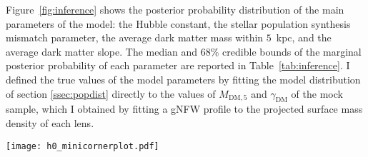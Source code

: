 \documentclass{aa}
\def\mfive{M_{\mathrm{DM},5}}
\def\gammadm{\gamma_{\mathrm{DM}}}
\def\asps{\alpha_{\mathrm{sps}}}
\def\Fref#1{Figure~\ref{#1}\xspace}
\def\Tref#1{Table~\ref{#1}\xspace}
\begin{document}
\Fref{fig:inference} shows the posterior probability distribution of the main parameters of the model: the Hubble constant, the stellar population synthesis mismatch parameter, the average dark matter mass within $5$~kpc, and the average dark matter slope.
The median and 68\% credible bounds of the marginal posterior probability of each parameter are reported in \Tref{tab:inference}.
I defined the true values of the model parameters by fitting the model distribution of section \ref{ssec:popdist} directly to the values of $\mfive$ and $\gammadm$ of the mock sample, which I obtained by fitting a gNFW profile to the projected surface mass density of each lens.
%
\begin{figure*}
\texttt{[image: h0\_minicornerplot.pdf]}
\caption{
Posterior probability distribution of the four key parameters of the model: the Hubble constant, the stellar population synthesis mismatch parameter, the average $\log{\mfive}$, and the average $\gammadm$. 
Purple filled contours correspond to the fit to the sample of 100 time-delay lenses, with no extra information.
Red lines show the posterior probability obtained by using prior information on the model parameters from the sample of 1000 strong lenses simulated in .
Contour levels correspond to 68\% and 95\% enclosed probability regions.
Dashed lines indicate the true values of the parameters, which are defined by fitting the model directly to the distribution of $\log{\mfive}$, $\gammadm$, and $\log{\asps}$ of the mock sample.
\label{fig:inference}
}
\end{figure*}
%
\end{document}
